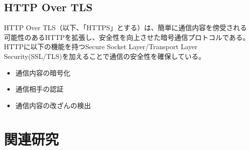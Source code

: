 \documentclass[12pt,a4paper]{jbook}
\begin{document}
\subsection{HTTP Over TLS}
\label{sec:https}
HTTP Over TLS\cite{https}（以下、「HTTPS」とする）は、簡単に通信内容を傍受される可能性のあるHTTPを拡張し、安全性を向上させた暗号通信プロトコルである。
HTTPに以下の機能を持つSecure Socket Layer/Transport Layer Security(SSL/TLS)を加えることで通信の安全性を確保している。
\begin{itemize}
\item 通信内容の暗号化
\item 通信相手の認証
\item 通信内容の改ざんの検出
\end{itemize}

\section{関連研究}
\end{document}
